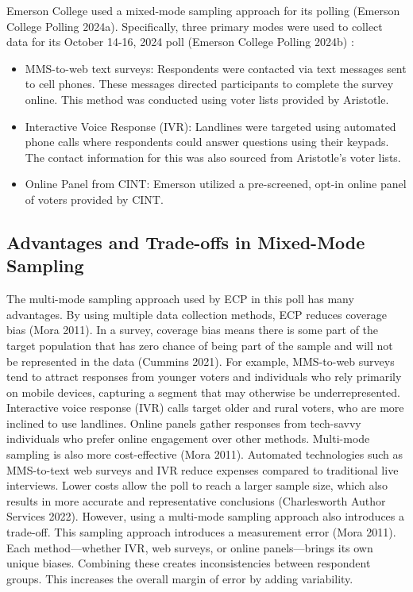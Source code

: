 \documentclass[
  letterpaper,
  DIV=11,
  numbers=noendperiod]{scrartcl}
\begin{document}
Emerson College used a mixed-mode sampling approach for its polling
(Emerson College Polling 2024a). Specifically, three primary modes were
used to collect data for its October 14-16, 2024 poll (Emerson College
Polling 2024b) :

\begin{itemize}
\item
  MMS-to-web text surveys: Respondents were contacted via text messages
  sent to cell phones. These messages directed participants to complete
  the survey online. This method was conducted using voter lists
  provided by Aristotle.
\item
  Interactive Voice Response (IVR): Landlines were targeted using
  automated phone calls where respondents could answer questions using
  their keypads. The contact information for this was also sourced from
  Aristotle's voter lists.
\item
  Online Panel from CINT: Emerson utilized a pre-screened, opt-in online
  panel of voters provided by CINT.
\end{itemize}

\hypertarget{advantages-and-trade-offs-in-mixed-mode-sampling}{%
\subsection{Advantages and Trade-offs in Mixed-Mode
Sampling}\label{advantages-and-trade-offs-in-mixed-mode-sampling}}

The multi-mode sampling approach used by ECP in this poll has many
advantages. By using multiple data collection methods, ECP reduces
coverage bias (Mora 2011). In a survey, coverage bias means there is
some part of the target population that has zero chance of being part of
the sample and will not be represented in the data (Cummins 2021). For
example, MMS-to-web surveys tend to attract responses from younger
voters and individuals who rely primarily on mobile devices, capturing a
segment that may otherwise be underrepresented. Interactive voice
response (IVR) calls target older and rural voters, who are more
inclined to use landlines. Online panels gather responses from
tech-savvy individuals who prefer online engagement over other methods.
Multi-mode sampling is also more cost-effective (Mora 2011). Automated
technologies such as MMS-to-text web surveys and IVR reduce expenses
compared to traditional live interviews. Lower costs allow the poll to
reach a larger sample size, which also results in more accurate and
representative conclusions (Charlesworth Author Services 2022). However,
using a multi-mode sampling approach also introduces a trade-off. This
sampling approach introduces a measurement error (Mora 2011). Each
method---whether IVR, web surveys, or online panels---brings its own
unique biases. Combining these creates inconsistencies between
respondent groups. This increases the overall margin of error by adding
variability.
\end{document}
